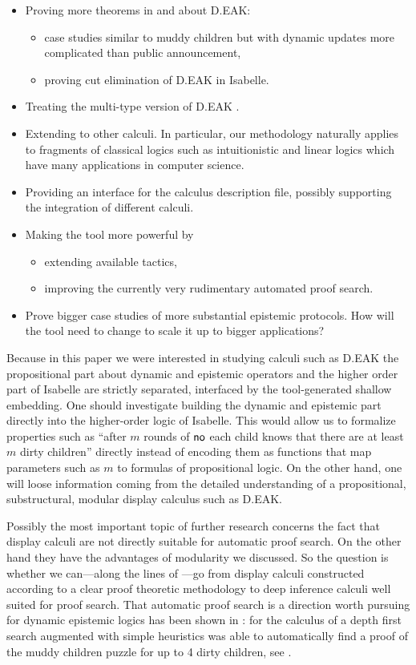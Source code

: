 \documentclass[runningheads,a4paper]{llncs}
\begin{document}
\begin{itemize}
\item Proving more theorems in and about D.EAK:
\begin{itemize}
\item  case studies similar to muddy children but with dynamic updates more complicated than public announcement,
\item proving cut elimination of D.EAK in Isabelle.
\end{itemize}
\item Treating the multi-type version of D.EAK \cite{Multitype}.
\item Extending to other calculi. In particular, our methodology naturally applies to fragments of classical logics such as intuitionistic and linear logics which have many applications in computer science. 
\item Providing an interface for the calculus description file, possibly supporting the integration of different calculi.
\item Making the tool more powerful by
\begin{itemize}
\item extending available tactics,
\item improving the currently very rudimentary automated proof search.
\end{itemize}
\item Prove bigger case studies of more substantial epistemic protocols. How will the tool need to change to scale it up to bigger applications?
\end{itemize}

\noindent
Because in this paper we were interested in studying calculi such as D.EAK 
the propositional part about dynamic and epistemic operators and the higher order part of Isabelle are strictly separated, interfaced by the tool-generated shallow embedding. One should investigate building the dynamic and epistemic part directly into the higher-order logic of Isabelle. This would allow us to formalize properties such as  ``after $m$ rounds of $\textsf{no}$ each child knows that there are at least $m$ dirty children'' directly instead of encoding them as functions that map parameters such as $m$ to formulas of propositional logic. On the other hand, one will loose information coming from the detailed understanding of a propositional, substructural, modular
display calculus such as D.EAK.

\medskip Possibly the most important topic of further research concerns the fact that display calculi are not directly suitable for automatic proof search. On the other hand they have the advantages of modularity we discussed. So the question is whether we can---along the lines of \cite{GorePT09}---go from display calculi constructed according to a clear proof theoretic methodology to deep inference calculi well suited for proof search. That automatic proof search is a direction worth pursuing for dynamic epistemic logics has been shown in \cite{Truffaut:msc}: for the calculus of \cite{Dyckhoff} a depth first search augmented with simple heuristics was able to automatically find a proof of the muddy children puzzle for up to 4 dirty children, see \cite[.3]{Truffaut:msc}.
\end{document}
